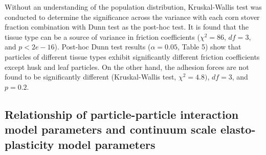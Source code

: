\documentclass[xcolor=dvipsnames,10pt,hidelinks]{article}
\let\oldsubsection\subsection
\renewcommand{\subsection}{\clearpage\oldsubsection}
\begin{document}
Without an understanding of the population distribution,
Kruskal-Wallis test was conducted to determine the significance across the variance with each corn stover fraction combination with Dunn test as the post-hoc test.
It is found that the tissue type can be a source of variance in friction coefficients (\(\chi^2 = 86\), \(df = 3\), and \(p < 2e-16\)).
Post-hoc Dunn test results (\(\alpha = 0.05\), Table 5) show that particles of different tissue types exhibit significantly different friction coefficients except husk and leaf particles.
On the other hand, the adhesion forces are not found to be significantly different (Kruskal-Wallis test, \(\chi^2 = 4.8)\), \(df = 3\), and \(p = 0.2\).
\subsection{Relationship of particle-particle interaction model parameters and continuum scale elasto-plasticity model parameters}
\label{sec:org02e83ed}
\end{document}
